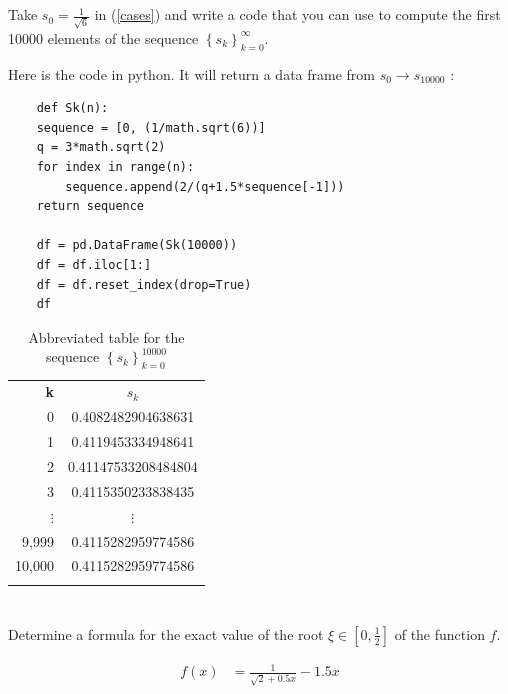 \documentclass{article}
\begin{document}
\section{}
Take $s_0 = \frac{1}{\sqrt{6}}$ in (\ref{cases}) and write a code that you can use to compute the first 10000 elements of the sequence $\left\{ s_k \right\}^{\infty}_{k=0}$.
\vspace{10mm}


Here is the code in python. It will return a data frame from $s_0\to s_10000$ :
\begin{verbatim}
    def Sk(n):
    sequence = [0, (1/math.sqrt(6))]
    q = 3*math.sqrt(2)
    for index in range(n):
        sequence.append(2/(q+1.5*sequence[-1]))
    return sequence

    df = pd.DataFrame(Sk(10000))
    df = df.iloc[1:]
    df = df.reset_index(drop=True)
    df
\end{verbatim}

\begin{table}[H]
    \centering
    \begin{tabular}{|r|c|}
        \Xhline{1 pt}
         \textbf{k}& \textbf{$s_k$}  \\
         \Xhline{1.5 pt}
         0 & 0.4082482904638631\\
         \Xhline{1 pt}
         1 & 0.4119453334948641\\
         \Xhline{1 pt}
         2 & 0.41147533208484804\\
         \Xhline{1 pt}
         3 & 0.4115350233838435\\
         \Xhline{1 pt}
         $\vdots$ & $\vdots$\\
          \Xhline{1 pt}
         9,999 & 0.4115282959774586\\
          \Xhline{1 pt}
         10,000 & 0.4115282959774586\\
         \Xhline{1 pt}
    \end{tabular}
    \caption{Abbreviated table for the sequence $\left\{ s_k\right\}_{k=0}^{10000}$}
    \label{tab:10sequence}
\end{table}


\section{}
Determine a formula for the exact value of the root $\xi \in \left[0,\frac{1}{2} \right]$ of the function $f$.
\vspace{10mm}

\begin{align*}
    f(x) &= \frac{1}{\sqrt{2}+0.5x}-1.5x\\
\end{align*}
\end{document}
